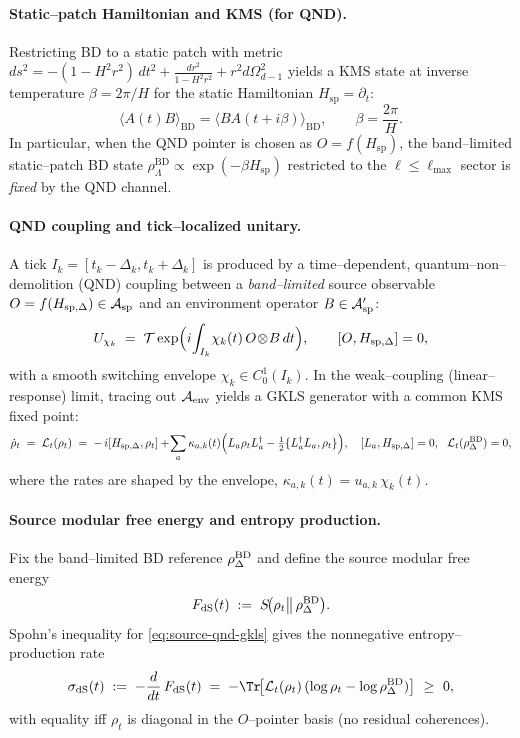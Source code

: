 \documentclass[10pt]{article}
\theoremstyle{definition}
\theoremstyle{plain}
\begin{document}
\paragraph{Static–patch Hamiltonian and KMS (for QND).}\label{par:uom-main-028}
Restricting BD to a static patch with metric
$ds^2=-(1-H^2 r^2)\,dt^2+\frac{dr^2}{1-H^2 r^2}+r^2 d\Omega_{d-1}^2$ yields a
KMS state at inverse temperature $\beta=2\pi/H$ for the static Hamiltonian
$H_{\mathrm{sp}}=\partial_t$:
\[
\langle A(t) B\rangle_{\mathrm{BD}}=\langle B A(t+i\beta)\rangle_{\mathrm{BD}},
\qquad \beta=\frac{2\pi}{H}.
\]
In particular, when the QND pointer is chosen as $O=f(H_{\mathrm{sp}})$, the
band–limited static–patch BD state $\rho^{\mathrm{BD}}_\Lambda\propto
\exp(-\beta H_{\mathrm{sp}})$ restricted to the $\ell\le \ell_{\max}$ sector is
\emph{fixed} by the QND channel.

\paragraph{QND coupling and tick–localized unitary.}\label{par:uom-main-029}
A tick $I_k=[t_k-\Delta_k,t_k+\Delta_k]$ is produced by a time–dependent,
quantum–non–demolition (QND) coupling between a \emph{band–limited} source observable
$O=f(H_{{\rm sp},\Delta})\in\mathcal A_{\rm sp}$ and an environment operator
$B\in\mathcal A_{\rm sp}'$:
\begin{equation}
U_{\chi_k}\;=\;\mathcal T\exp\!\Big(i\!\int_{I_k}\!\chi_k(t)\,O\!\otimes\! B\,dt\Big),
\qquad [O,H_{{\rm sp},\Delta}]=0,
\label{eq:source-qnd-unitary}
\end{equation}
with a smooth switching envelope $\chi_k\in C_0^1(I_k)$.
In the weak–coupling (linear–response) limit, tracing out $\mathcal A_{\rm env}$ yields a
GKLS generator with a common KMS fixed point:
\begin{equation}
\dot\rho_t\;=\;\mathcal L_t(\rho_t)\;=\;-\,i[H_{{\rm sp},\Delta},\rho_t]
+\!\sum_a\kappa_{a,k}(t)\Big(L_a\rho_t L_a^\dagger-\tfrac12\{L_a^\dagger L_a,\rho_t\}\Big),
\quad [L_a,H_{{\rm sp},\Delta}]=0,\ \ \mathcal L_t(\rho^{\rm BD}_\Delta)=0,
\label{eq:source-qnd-gkls}
\end{equation}
where the rates are shaped by the envelope, $\kappa_{a,k}(t)=u_{a,k}\,\chi_k(t)$.

\paragraph{Source modular free energy and entropy production.}\label{par:uom-main-030}
Fix the band–limited BD reference $\rho^{\rm BD}_\Delta$ and define the
source modular free energy
\begin{equation}
F_{\rm dS}(t)\;:=\;S\!\big(\rho_t\big\|\,\rho^{\rm BD}_\Delta\big).
\label{eq:FdS-def}
\end{equation}
Spohn’s inequality for \eqref{eq:source-qnd-gkls} gives the nonnegative entropy–production rate
\begin{equation}
\sigma_{\rm dS}(t)\;:=\;-\frac{d}{dt}\,F_{\rm dS}(t)
\;=\;-\Tr\!\big[\mathcal L_t(\rho_t)\,(\log\rho_t-\log\rho^{\rm BD}_\Delta)\big]\ \ge\ 0,
\label{eq:spohn-source}
\end{equation}
with equality iff $\rho_t$ is diagonal in the $O$–pointer basis (no residual coherences).
\end{document}
